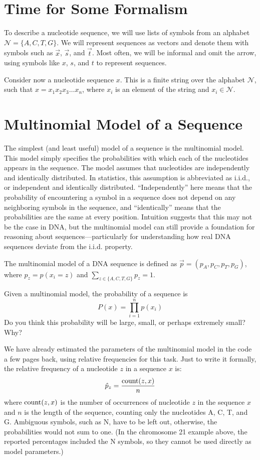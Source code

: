 \section*{Time for Some Formalism}

To describe a nucleotide sequence, we will use lists of symbols from an alphabet $\mathcal{N} = \{A, C, T, G\}$. We will represent sequences as vectors and denote them with symbols such as $\vec{x}$, $\vec{s}$, and $\vec{t}$. Most often, we will be informal and omit the arrow, using symbols like $x$, $s$, and $t$ to represent sequences.

Consider now a nucleotide sequence $x$. This is a finite string over the alphabet $\mathcal{N}$, such that $x = x_1x_2x_3 \dots x_n$, where $x_i$ is an element of the string and $x_i \in \mathcal{N}$.

\section*{Multinomial Model of a Sequence}

The simplest (and least useful) model of a sequence is the multinomial model. This model simply specifies the probabilities with which each of the nucleotides appears in the sequence. The model assumes that nucleotides are independently and identically distributed. In statistics, this assumption is abbreviated as i.i.d., or independent and identically distributed. ``Independently'' here means that the probability of encountering a symbol in a sequence does not depend on any neighboring symbols in the sequence, and ``identically'' means that the probabilities are the same at every position. Intuition suggests that this may not be the case in DNA, but the multinomial model can still provide a foundation for reasoning about sequences—particularly for understanding how real DNA sequences deviate from the i.i.d. property.

The multinomial model of a DNA sequence is defined as $\vec{p} = (p_A, p_C, p_T, p_G)$, where $p_z = p(x_i = z)$ and $\sum_{z \in \{A, C, T, G\}} p_z = 1$.

Given a multinomial model, the probability of a sequence is
\[
P(x) = \prod_{i=1}^{n} p(x_i)
\]
Do you think this probability will be large, small, or perhaps extremely small? Why?

We have already estimated the parameters of the multinomial model in the code a few pages back, using relative frequencies for this task. Just to write it formally, the relative frequency of a nucleotide $z$ in a sequence $x$ is:
\[
\hat{p}_z = \frac{{\rm count}(z, x)}{n}
\]
where ${\rm count}(z, x)$ is the number of occurrences of nucleotide $z$ in the sequence $x$ and $n$ is the length of the sequence, counting only the nucleotides A, C, T, and G. Ambiguous symbols, such as N, have to be left out, otherwise, the probabilities would not sum to one. (In the chromosome 21 example above, the reported percentages included the N symbols, so they cannot be used directly as model parameters.)

